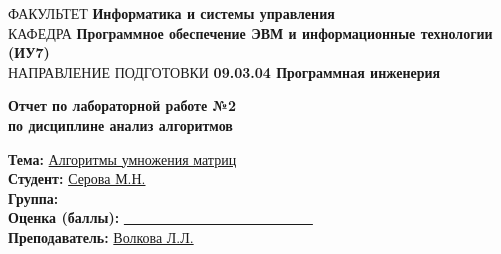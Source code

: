 \begin{titlepage}
	{\doublespacing \small \raggedright ФАКУЛЬТЕТ \hspace{2mm} \textbf{Информатика и системы управления}\\
		КАФЕДРА \hspace{2mm} \textbf{Программное обеспечение ЭВМ и информационные технологии (ИУ7)}\\
		НАПРАВЛЕНИЕ ПОДГОТОВКИ \hspace{2mm} \textbf{09.03.04 Программная инженерия}\\}
	
	
	\vspace{30mm}
	
	\begin{center}
			\centering
			\Large\textbf{  Отчет по лабораторной работе №2}\\
			\textbf{по дисциплине анализ алгоритмов}\\
	\end{center}
	\vspace{20mm}

	
	{\doublespacing\raggedright
		\textbf{Тема:} \hspace{27mm}\underline{Алгоритмы умножения матриц}\\
		\textbf{Студент:} \hspace{17mm} \underline{Серова М.Н.}\\
		\textbf{Группа:} \hspace{21mm}\underline{}\\
		\textbf{Оценка (баллы):} \underline{~~~~~~~~~~~~~~~~~~~~~~~~~~~}\\
	\textbf{Преподаватель:} \hspace{2mm}\underline{Волкова Л.Л.}\\}
	


\end{titlepage}
